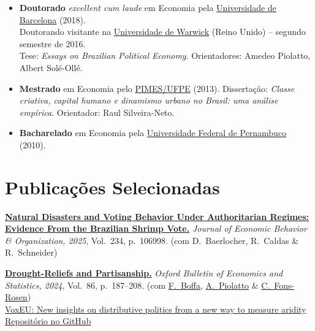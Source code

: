 \documentclass[a4paper,9pt]{article}
\newcommand{\cvgap}{\vspace{2mm}}
\begin{document}
\begin{itemize}

\item{\textbf{Doutorado} \emph{excellent cum laude} em Economia pela \href{http://www.ub.edu/school-economics/}{Universidade de Barcelona} (2018). \\ Doutorando visitante na \href{https://warwick.ac.uk/fac/soc/economics/}{Universidade de Warwick} (Reino Unido) -- segundo semestre de 2016. \\ Tese: \emph{Essays on Brazilian Political Economy}. Orientadores: Amedeo Piolatto, Albert Sol\'e-Oll\'e.}

\item{\textbf{Mestrado} em Economia pelo \href{https://sites.google.com/view/pimes/principal}{PIMES/UFPE} (2013). Dissertação: \emph{Classe criativa, capital humano e dinamismo urbano no Brasil: uma análise empírica}. Orientador: Raul Silveira-Neto.}

\item{\textbf{Bacharelado} em Economia pela \href{https://www.ufpe.br/ccsa/}{Universidade Federal de Pernambuco} (2010).}

\end{itemize}

\section{Publicações Selecionadas}

\textbf{\href{https://doi.org/10.1016/j.jebo.2025.106998}{Natural Disasters and Voting Behavior Under Authoritarian Regimes: Evidence From the Brazilian Shrimp Vote.}} \emph{Journal of Economic Behavior \& Organization, 2025}, Vol.~234, p.~106998. (com D.~Baerlocher, R.~Caldas \& R.~Schneider)

\cvgap

\textbf{\href{https://onlinelibrary.wiley.com/doi/full/10.1111/obes.12560}{Drought-Reliefs and Partisanship.}} \emph{Oxford Bulletin of Economics and Statistics, 2024}, Vol.~86, p.~187--208. (com \href{https://sites.google.com/site/federicoboffaunibz/}{F.~Boffa}, \href{https://sites.google.com/site/piolatto/home}{A.~Piolatto} \& \href{https://sites.google.com/site/cfonsrosen/home}{C.~Fons-Rosen}) \\
\hspace{2em} \href{https://voxeu.org/article/insights-distributive-politics-new-way-measure-aridity}{VoxEU: New insights on distributive politics from a new way to measure aridity} \\
\hspace{2em} \href{https://github.com/FranciscoCavalcanti/Drought-reliefs-and-Partisanship}{Repositório no GitHub}
\end{document}
